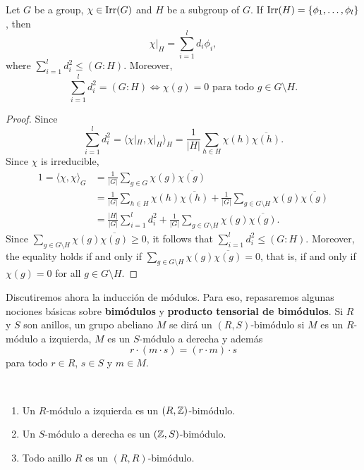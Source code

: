\begin{proposition}
    Let $G$ be a group, $\chi\in\operatorname{Irr}(G)$ and $H$ be a subgroup of $G$. 
    If $\operatorname{Irr}(H)=\{\phi_1,\dots,\phi_l\}$, then 
    \[
    \chi|_H=\sum_{i=1}^ld_i\phi_i,
    \]
    where $\sum_{i=1}^l d_i^2\leq (G:H)$. Moreover, 
    \[
    \sum_{i=1}^l d_i^2=(G:H) 
    \Longleftrightarrow
    \chi(g)=0\text{ para todo $g\in G\setminus H$.}
    \]
\end{proposition}

\begin{proof}
    Since  
    \[
    \sum_{i=1}^ld_i^2=\langle\chi|_H,\chi|_H\rangle_H=\frac{1}{|H|}\sum_{h\in H}\chi(h)\overline{\chi(h)}.
    \]
    Since $\chi$ is irreducible, 
    \begin{align*}
        1=\langle\chi,\chi\rangle_G&=\frac{1}{|G|}\sum_{g\in G}\chi(g)\overline{\chi(g)}\\
        &=\frac{1}{|G|}\sum_{h\in H}\chi(h)\overline{\chi(h)}
        +\frac{1}{|G|}\sum_{g\in G\setminus H}\chi(g)\overline{\chi(g)}\\
        &=\frac{|H|}{|G|}\sum_{i=1}^l d_i^2+\frac{1}{|G|}\sum_{g\in G\setminus H}\chi(g)\overline{\chi(g)}.
    \end{align*}
    Since $\sum_{g\in G\setminus H}\chi(g)\overline{\chi(g)}\geq0$, it follows that
    $\sum_{i=1}^ld_i^2\leq(G:H)$. Moreover, 
    the equality holds if and only if $\sum_{g\in G\setminus H}\chi(g)\overline{\chi(g)}=0$, 
    that is, if and only if $\chi(g)=0$ for all $g\in G\setminus H$.
\end{proof}

Discutiremos ahora la inducción de módulos. Para eso, repasaremos algunas nociones básicas sobre
\textbf{bimódulos} y \textbf{producto tensorial de bimódulos}. 
Si $R$ y $S$ son anillos, un grupo abeliano $M$ se dirá un $(R,S)$-bimódulo si 
$M$ es un $R$-módulo a izquierda, $M$ es un $S$-módulo a derecha y además
\[
r\cdot (m\cdot s)=(r\cdot m)\cdot s
\]
para todo $r\in R$, $s\in S$ y $m\in M$. 

\begin{examples}\
\begin{enumerate}
    \item Un $R$-módulo a izquierda es un $(R,\mathbb{Z})$-bimódulo.
    \item Un $S$-módulo a derecha es un $(\mathbb{Z},S)$-bimódulo.
    \item Todo anillo $R$ es un $(R,R)$-bimódulo.
\end{enumerate}
\end{examples}

